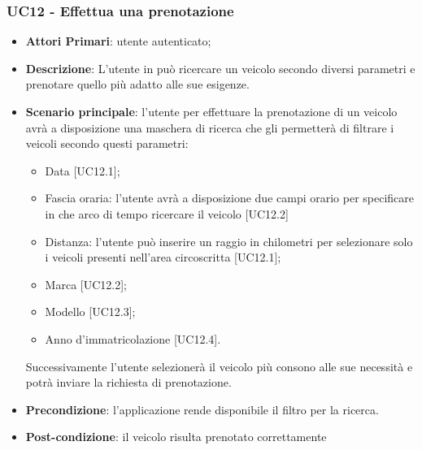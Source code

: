 \subsubsection{UC12 - Effettua una prenotazione}
\begin{itemize}
	\item \textbf{Attori Primari}: utente autenticato;
	\item \textbf{Descrizione}: L'utente in può ricercare un veicolo secondo diversi parametri e prenotare quello più adatto alle sue esigenze.
	\item \textbf{Scenario principale}: l'utente per effettuare la prenotazione di un veicolo avrà a disposizione una maschera di ricerca che gli permetterà di filtrare i veicoli secondo questi parametri:
	\begin{itemize}
		\item Data [UC12.1];
		\item Fascia oraria: l'utente avrà a disposizione due campi orario per specificare in che arco di tempo ricercare il veicolo [UC12.2]
		\item Distanza: l'utente può inserire un raggio in chilometri per selezionare solo i veicoli presenti nell'area circoscritta [UC12.1]; 
		\item Marca [UC12.2];
		\item Modello [UC12.3];
		\item Anno d'immatricolazione [UC12.4].
	\end{itemize}
	Successivamente l'utente selezionerà il veicolo più consono alle sue necessità e potrà inviare la richiesta di prenotazione.
	\item \textbf{Precondizione}: l'applicazione rende disponibile il filtro per la ricerca.
	\item \textbf{Post-condizione}: il veicolo risulta prenotato correttamente
\end{itemize} 
